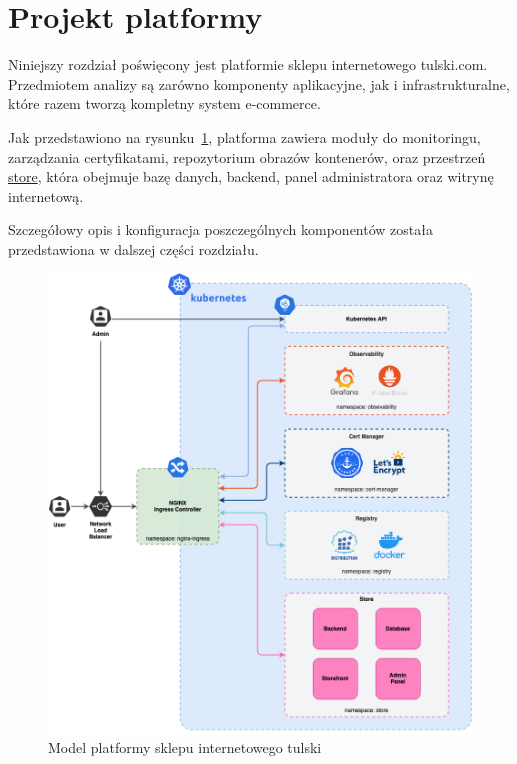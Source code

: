 \newpage

\section{Projekt platformy}\label{sec:projekt-platformy}

Niniejszy rozdział poświęcony jest platformie sklepu internetowego tulski.com.
Przedmiotem analizy są zarówno komponenty aplikacyjne, jak i infrastrukturalne, które razem tworzą kompletny system e-commerce.

Jak przedstawiono na rysunku~\ref{fig:platform-model}, platforma zawiera moduły do monitoringu, zarządzania certyfikatami, repozytorium obrazów kontenerów, oraz przestrzeń \url{store}, która obejmuje bazę danych, backend, panel administratora oraz witrynę internetową.

Szczegółowy opis i konfiguracja poszczególnych komponentów została przedstawiona w dalszej części rozdziału.

\begin{figure}[p]
    \centering
    \includegraphics[width=\textwidth]{img/main-infra-model}
    \caption{Model platformy sklepu internetowego tulski}
    \label{fig:platform-model}
\end{figure}

